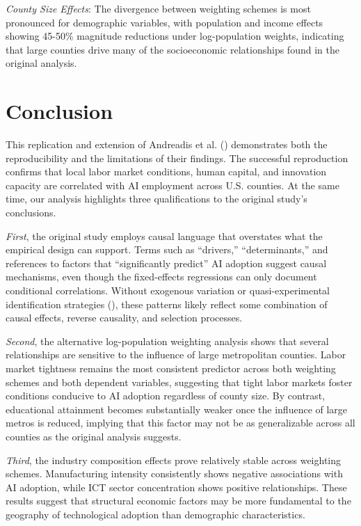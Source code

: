 \documentclass[
]{article}
\begin{document}
\emph{County Size Effects}: The divergence between weighting schemes is
most pronounced for demographic variables, with population and income
effects showing 45-50\% magnitude reductions under log-population
weights, indicating that large counties drive many of the socioeconomic
relationships found in the original analysis.

\section{Conclusion}\label{conclusion}

This replication and extension of Andreadis et al.
() demonstrates both the
reproducibility and the limitations of their findings. The successful
reproduction confirms that local labor market conditions, human capital,
and innovation capacity are correlated with AI employment across U.S.
counties. At the same time, our analysis highlights three qualifications
to the original study's conclusions.

\emph{First}, the original study employs causal language that overstates
what the empirical design can support. Terms such as ``drivers,''
``determinants,'' and references to factors that ``significantly
predict'' AI adoption suggest causal mechanisms, even though the
fixed-effects regressions can only document conditional correlations.
Without exogenous variation or quasi-experimental identification
strategies (), these patterns
likely reflect some combination of causal effects, reverse causality,
and selection processes.

\emph{Second}, the alternative log-population weighting analysis shows
that several relationships are sensitive to the influence of large
metropolitan counties. Labor market tightness remains the most
consistent predictor across both weighting schemes and both dependent
variables, suggesting that tight labor markets foster conditions
conducive to AI adoption regardless of county size. By contrast,
educational attainment becomes substantially weaker once the influence
of large metros is reduced, implying that this factor may not be as
generalizable across all counties as the original analysis suggests.

\emph{Third}, the industry composition effects prove relatively stable
across weighting schemes. Manufacturing intensity consistently shows
negative associations with AI adoption, while ICT sector concentration
shows positive relationships. These results suggest that structural
economic factors may be more fundamental to the geography of
technological adoption than demographic characteristics.
\end{document}
